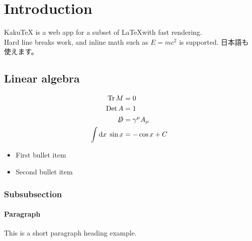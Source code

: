 \documentclass[11pt]{article}
\newcommand{\Tr}{\operatorname{Tr}}
\newcommand{\Det}{\operatorname{Det}}
\begin{document}
\section{Introduction}
KakuTeX is a web app for a subset of \LaTeX with fast rendering.\\
Hard line breaks work, and inline math such as $E=mc^2$ is supported.
日本語も使えます。

\subsection{Linear algebra}
\begin{align}
\Tr M &= 0 \\
\Det A &= 1 \\
\slashed{D} &= \gamma^\mu A_\mu \\
\int \mathrm{d}x \; \sin x &= -\cos x + C
\end{align}

\begin{itemize}
\item First bullet item
\item Second bullet item
\end{itemize}

\subsubsection{Subsubsection}
\paragraph{Paragraph} This is a short paragraph heading example.
\end{document}
